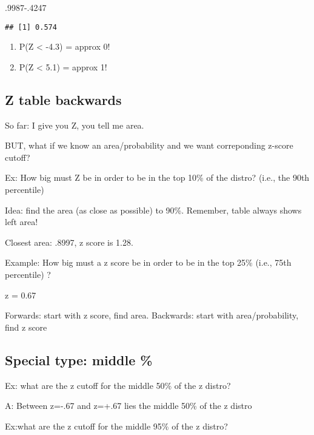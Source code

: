 \documentclass[]{article}
\newenvironment{Shaded}{\begin{snugshade}}{\end{snugshade}}
\newcommand{\FloatTok}[1]{\textcolor[rgb]{0.00,0.00,0.81}{#1}}
\begin{document}
\begin{Shaded}
\begin{Highlighting}[]
\FloatTok{.9987-.4247}
\end{Highlighting}
\end{Shaded}

\begin{verbatim}
## [1] 0.574
\end{verbatim}

\begin{enumerate}
\def\labelenumi{\alph{enumi})}
\setcounter{enumi}{3}
\item
  P(Z \textless{} -4.3) = approx 0!
\item
  P(Z \textless{} 5.1) = approx 1!
\end{enumerate}

\hypertarget{z-table-backwards}{%
\subsection{Z table backwards}\label{z-table-backwards}}

So far: I give you Z, you tell me area.

BUT, what if we know an area/probability and we want correponding
z-score cutoff?

Ex: How big must Z be in order to be in the top 10\% of the distro?
(i.e., the 90th percentile)

Idea: find the area (as close as possible) to 90\%. Remember, table
always shows left area!

Closest area: .8997, z score is 1.28.

Example: How big must a z score be in order to be in the top 25\% (i.e.,
75th percentile) ?

z = 0.67

Forwards: start with z score, find area. Backwards: start with
area/probability, find z score

\hypertarget{special-type-middle}{%
\subsection{Special type: middle \%}\label{special-type-middle}}

Ex: what are the z cutoff for the middle 50\% of the z distro?

A: Between z=-.67 and z=+.67 lies the middle 50\% of the z distro

Ex:what are the z cutoff for the middle 95\% of the z distro?
\end{document}
